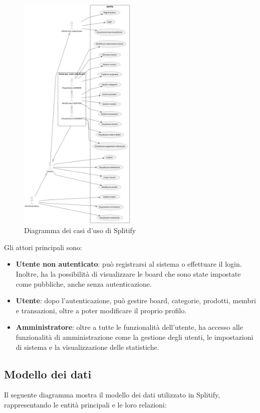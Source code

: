 \documentclass[11pt]{article}
\begin{document}
\begin{figure}[H]
    \centering
    \includegraphics[width=0.5\textwidth]{assets/usecase.png}
    \caption{Diagramma dei casi d'uso di Splitify}
\end{figure}

Gli attori principali sono:
\begin{itemize}
    \item \textbf{Utente non autenticato}: può registrarsi al sistema o effettuare il login. Inoltre, ha la possibilità di visualizzare le board che sono state impostate come pubbliche, anche senza autenticazione.
    \item \textbf{Utente}: dopo l'autenticazione, può gestire board, categorie, prodotti, membri e transazioni, oltre a poter modificare il proprio profilo.
    \item \textbf{Amministratore}: oltre a tutte le funzionalità dell'utente, ha accesso alle funzionalità di amministrazione come la gestione degli utenti, le impostazioni di sistema e la visualizzazione delle statistiche.
\end{itemize}

\subsection{Modello dei dati}
Il seguente diagramma mostra il modello dei dati utilizzato in Splitify, rappresentando le entità principali e le loro relazioni:
\end{document}

